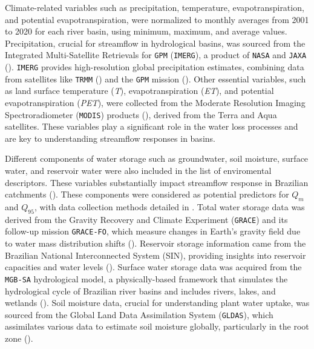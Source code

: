 \documentclass[12pt]{article}
\begin{document}
\par Climate-related variables such as precipitation, temperature, evapotranspiration, and potential evapotranspiration, were normalized to monthly averages from 2001 to 2020 for each river basin, using minimum, maximum, and average values. Precipitation, crucial for streamflow in hydrological basins, was sourced from the Integrated Multi-Satellite Retrievals for \texttt{GPM} (\texttt{IMERG}), a product of \texttt{NASA} and \texttt{JAXA} (\cite{huffman2020}). \texttt{IMERG} provides high-resolution global precipitation estimates, combining data from satellites like \texttt{TRMM} (\cite{huffman2007}) and the \texttt{GPM} mission (\cite{skofronick2017}). Other essential variables, such as land surface temperature (\textit{T}), evapotranspiration (\textit{ET}), and potential evapotranspiration (\textit{PET}), were collected from the Moderate Resolution Imaging Spectroradiometer (\texttt{MODIS}) products (\cite{mu2007, mu2011i}), derived from the Terra and Aqua satellites. These variables play a significant role in the water loss processes and are key to understanding streamflow responses in basins.

\par Different components of water storage such as groundwater, soil moisture, surface water, and reservoir water were also included in the list of enviromental descriptors. These variables substantially impact streamflow response in Brazilian catchments (\cite{barbedo2022b}). These components were considered as potential predictors for \( Q_{m} \) and \( Q_{95} \), with data collection methods detailed in \cite{barbedo2022a}. Total water storage data was derived from the Gravity Recovery and Climate Experiment (\texttt{GRACE}) and its follow-up mission \texttt{GRACE-FO}, which measure changes in Earth's gravity field due to water mass distribution shifts (\cite{landerer2020, tapley2004}). Reservoir storage information came from the Brazilian National Interconnected System (SIN), providing insights into reservoir capacities and water levels (\cite{ana2021}). Surface water storage data was acquired from the \texttt{MGB-SA} hydrological model, a physically-based framework that simulates the hydrological cycle of Brazilian river basins and includes rivers, lakes, and wetlands (\cite{siqueira2018}). Soil moisture data, crucial for understanding plant water uptake, was sourced from the Global Land Data Assimilation System (\texttt{GLDAS}), which assimilates various data to estimate soil moisture globally, particularly in the root zone (\cite{rodell2004}).
\end{document}
